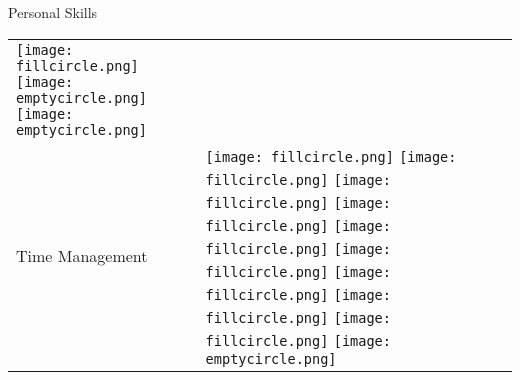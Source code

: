 \documentclass{resume}
\begin{document}
\begin{rSection}{Personal Skills}
\begin{table}[h!]
\begin{tabular}{p{10cm}p{6cm}}
    \texttt{[image: fillcircle.png]} 
    \texttt{[image: emptycircle.png]} 
	\texttt{[image: emptycircle.png]} \\
 	Time Management & 
 	\texttt{[image: fillcircle.png]} 
    \texttt{[image: fillcircle.png]} 
    \texttt{[image: fillcircle.png]}
    \texttt{[image: fillcircle.png]} 
    \texttt{[image: fillcircle.png]}
    \texttt{[image: fillcircle.png]} 
    \texttt{[image: fillcircle.png]}
    \texttt{[image: fillcircle.png]} 
    \texttt{[image: fillcircle.png]} 
	\texttt{[image: emptycircle.png]} \\
  \end{tabular}
\end{table}
\end{rSection}
\newpage
\end{document}
